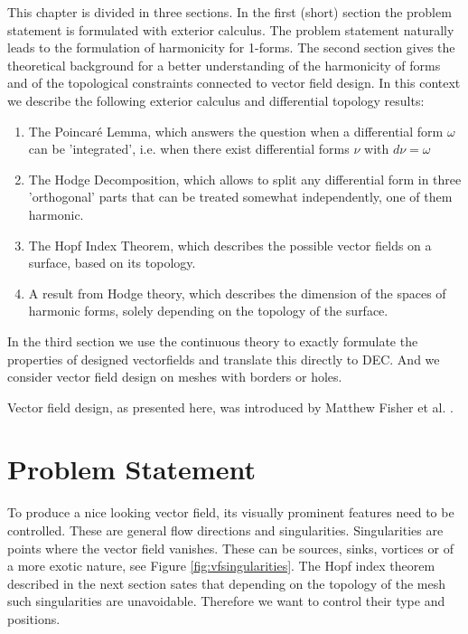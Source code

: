 This chapter is divided in three sections. In the first (short) section the problem statement is formulated with exterior calculus. The problem statement naturally leads to the formulation of harmonicity for 1-forms.  The second section gives the theoretical background for a better understanding of the harmonicity of forms and of the topological constraints connected to vector field design. In this context we describe the following exterior calculus and differential topology results:
\begin{enumerate}
\item The Poincar\'e Lemma, which answers the question when a differential form $\omega$ can be 'integrated', i.e. when there exist differential forms $\nu$ with $d\nu = \omega$
\item The Hodge Decomposition, which allows to split any differential form in three 'orthogonal' parts that can be treated somewhat independently, one of them harmonic.
\item The Hopf Index Theorem, which describes the possible vector fields on a surface, based on its topology.
\item A result from Hodge theory, which describes the dimension of the spaces of harmonic forms, solely depending on the topology of the surface.
\end{enumerate}
In the third section we use the continuous theory to  exactly formulate the properties of designed vectorfields and translate this directly to DEC. And we consider vector field design on meshes with borders or holes. 

Vector field design, as presented here, was introduced by Matthew Fisher et al. .

\section{Problem Statement}
\label{sec:vfproblemstatement}
To produce a nice looking vector field, its visually prominent features need to be controlled. These are general flow directions and singularities.
Singularities are points where the vector field vanishes. These can be sources, sinks, vortices or of a more exotic nature, see Figure \ref{fig:vfsingularities}. The Hopf index theorem described in the next section sates that depending on the topology of the mesh such singularities are unavoidable. Therefore we want to control their type and positions.

